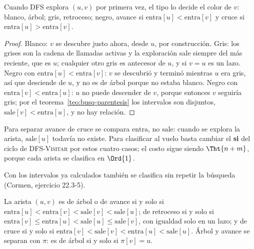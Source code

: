 \documentclass[11pt,letterpaper]{article}
\begin{document}
\begin{proposicion}
  \label{prop:busq-clasificacion}
  Cuando DFS explora $(u, v)$ por primera vez, el tipo lo decide el
  color de $v$: blanco, árbol; gris, retroceso; negro, avance si
  $\text{entra}[u] < \text{entra}[v]$ y cruce si
  $\text{entra}[u] > \text{entra}[v]$.
\end{proposicion}

\begin{proof}
  Blanco: $v$ se descubre justo ahora, desde $u$, por construcción.
  Gris: los grises son la cadena de llamadas activas y la exploración
  sale siempre del más reciente, que es $u$; cualquier otro gris es
  antecesor de $u$, y si $v = u$ es un lazo. Negro con
  $\text{entra}[u] < \text{entra}[v]$: $v$ se descubrió y terminó
  mientras $u$ era gris, así que desciende de $u$, y no es de árbol
  porque no estaba blanco. Negro con
  $\text{entra}[v] < \text{entra}[u]$: $u$ no puede descender de $v$,
  porque entonces $v$ seguiría gris; por el
  teorema~\ref{teo:busq-parentesis} los intervalos son disjuntos,
  $\text{sale}[v] < \text{entra}[u]$, y no hay relación.
\end{proof}

Para separar avance de cruce se compara $\text{entra}$, no
$\text{sale}$: cuando se explora la arista, $\text{sale}[u]$ todavía
no existe. Para clasificar al vuelo basta cambiar el \textbf{si} del
ciclo de \textsc{DFS-Visitar} por estos cuatro casos; el costo sigue
siendo $\Tht{n + m}$, porque cada arista se clasifica en $\Ord{1}$.

Con los intervalos ya calculados también se clasifica sin repetir la
búsqueda (Cormen, ejercicio 22.3-5).

\begin{proposicion}
  \label{prop:busq-intervalos}
  La arista $(u, v)$ es de árbol o de avance si y solo si
  $\text{entra}[u] < \text{entra}[v] < \text{sale}[v] < \text{sale}[u]$;
  de retroceso si y solo si
  $\text{entra}[v] \leq \text{entra}[u] < \text{sale}[u] \leq
  \text{sale}[v]$, con igualdad solo en un lazo; y de cruce si y solo
  si $\text{entra}[v] < \text{sale}[v] < \text{entra}[u] <
  \text{sale}[u]$. Árbol y avance se separan con $\pi$: es de árbol si
  y solo si $\pi[v] = u$.
\end{proposicion}
\end{document}
